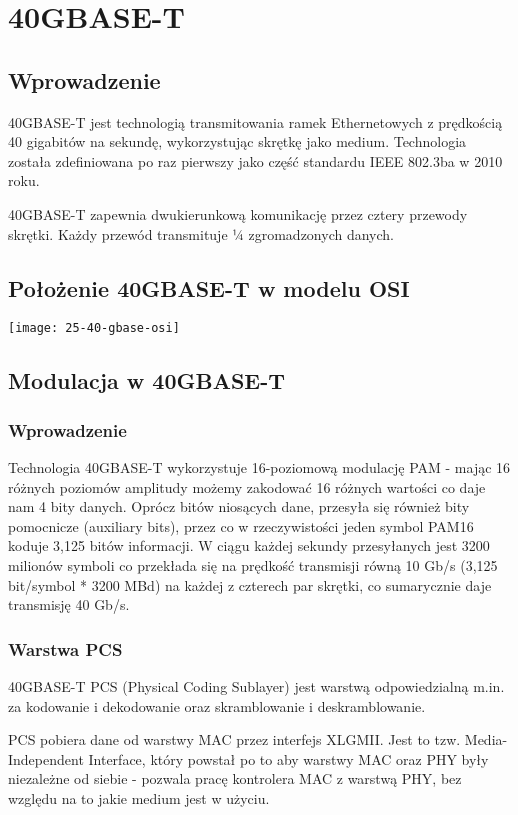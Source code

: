 \section{40GBASE-T}

\subsection{Wprowadzenie}
40GBASE-T jest technologią transmitowania ramek Ethernetowych z prędkością 40 gigabitów na sekundę, wykorzystując skrętkę jako medium. Technologia została zdefiniowana po raz pierwszy jako część standardu IEEE 802.3ba w 2010 roku.

40GBASE-T zapewnia dwukierunkową komunikację przez cztery przewody skrętki. Każdy przewód transmituje ¼ zgromadzonych danych.

\subsection{Położenie 40GBASE-T w modelu OSI}
\texttt{[image: 25-40-gbase-osi]}

\subsection{Modulacja w 40GBASE-T}
\subsubsection{Wprowadzenie}
Technologia 40GBASE-T wykorzystuje 16-poziomową modulację PAM - mając 16 różnych poziomów amplitudy możemy zakodować 16 różnych wartości co daje nam 4 bity danych.
Oprócz bitów niosących dane, przesyła się również bity pomocnicze (auxiliary bits), przez co w rzeczywistości jeden symbol PAM16 koduje 3,125 bitów informacji.
W ciągu każdej sekundy przesyłanych jest 3200 milionów symboli co przekłada się na prędkość transmisji równą 10 Gb/s (3,125 bit/symbol * 3200 MBd) na każdej z czterech par skrętki, co sumarycznie daje transmisję 40 Gb/s.

\subsubsection{Warstwa PCS}
40GBASE-T PCS (Physical Coding Sublayer) jest warstwą odpowiedzialną m.in. za kodowanie i dekodowanie oraz skramblowanie i deskramblowanie.

PCS pobiera dane od warstwy MAC przez interfejs XLGMII. Jest to tzw. Media-Independent Interface, który powstał po to aby warstwy MAC oraz PHY były niezależne od siebie - pozwala pracę kontrolera MAC z warstwą PHY, bez względu na to jakie medium jest w użyciu.

